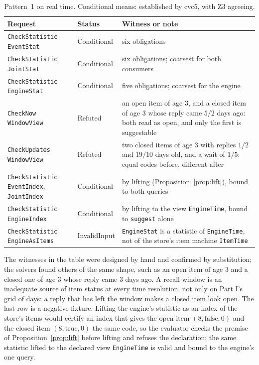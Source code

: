 \documentclass[11pt]{article}
\newcommand{\code}[1]{\texttt{#1}}
\theoremstyle{definition}
\theoremstyle{plain}
\begin{document}
\begin{table}[ht]
\centering\small
\begin{tabularx}{\textwidth}{>{\raggedright\arraybackslash}p{4.4cm}>{\raggedright\arraybackslash}p{1.95cm}>{\raggedright\arraybackslash}X}
\toprule
Request & Status & Witness or note\\
\midrule
\code{CheckStatistic EventStat} & Conditional & six obligations\\
\code{CheckStatistic JointStat} & Conditional & six obligations; coarsest for both consumers\\
\code{CheckStatistic EngineStat} & Conditional & five obligations; coarsest for the engine\\
\code{CheckNow WindowView} & Refuted & an open item of age $3$, and a closed item of age $3$ whose
reply came $5/2$ days ago: both read as open, and only the first is suggestable\\
\code{CheckUpdates WindowView} & Refuted & two closed items of age $3$ with replies $1/2$ and
$19/10$ days old, and a wait of $1/5$: equal codes before, different after\\
\code{CheckStatistic EventIndex}, \code{JointIndex} & Conditional & by lifting
(Proposition~\ref{prop:lift}), bound to both queries\\
\code{CheckStatistic EngineIndex} & Conditional & by lifting to the view \code{EngineTime}, bound to
\code{suggest} alone\\
\code{CheckStatistic EngineAsItems} & InvalidInput & \code{EngineStat} is a statistic of
\code{EngineTime}, not of the store's item machine \code{ItemTime}\\
\bottomrule
\end{tabularx}
\caption{Pattern~1 on real time. Conditional means: established by cvc5, with Z3
agreeing.}\label{tab:lp1}
\end{table}

The witnesses in the table were designed by hand and confirmed by substitution; the solvers found
others of the same shape, such as an open item of age $3$ and a closed one of age $3$ whose reply
came $3$ days ago. A recall window is an inadequate source of item status at every time resolution,
not only on Part I's grid of days: a reply that has left the window makes a closed item look open.
The last row is a negative fixture. Lifting the engine's statistic as an index of the store's items
would certify an index that gives the open item $(8,\mathrm{false},0)$ and the closed item
$(8,\mathrm{true},0)$ the same code, so the evaluator checks the premise of
Proposition~\ref{prop:lift} before lifting and refuses the declaration; the same statistic lifted to
the declared view \code{EngineTime} is valid and bound to the engine's one query.
\end{document}
